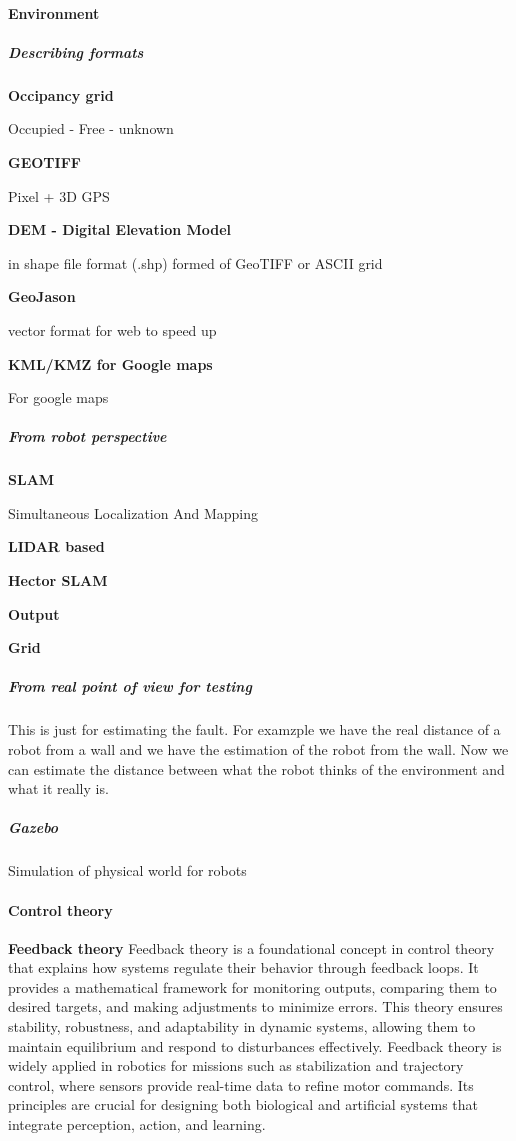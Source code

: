 \documentclass{book}
\providecommand{\ProjectDeepHeading}[2]{%
    \par\medskip\noindent\textbf{#2}\par\smallskip
}
\begin{document}

\paragraph{Environment}

\subparagraph{Describing formats}
    \ProjectDeepHeading{3}{Occipancy grid}
        Occupied - Free  - unknown
    
    
    \ProjectDeepHeading{3}{GEOTIFF}
        Pixel + 3D GPS
        
    \ProjectDeepHeading{3}{DEM - Digital Elevation Model}
        in shape file format (.shp) formed of GeoTIFF or ASCII grid
        
    \ProjectDeepHeading{3}{GeoJason}
        vector format for web to speed up
        
    \ProjectDeepHeading{3}{KML/KMZ for Google maps}
        For google maps


\subparagraph{From robot perspective}
    \ProjectDeepHeading{1}{SLAM}
        Simultaneous Localization And Mapping
        \ProjectDeepHeading{2}{LIDAR based}
            \ProjectDeepHeading{2}{Hector SLAM}
        \ProjectDeepHeading{2}{Output}
            \ProjectDeepHeading{3}{Grid}

\subparagraph{From real point of view for testing}
    This is just for estimating the fault. For examzple we have the real distance of a robot from a wall and we have the estimation of the robot from the wall. Now we can estimate the distance between what the robot thinks of the environment and what it really is.


\subparagraph{Gazebo}
Simulation of physical world for robots


\paragraph{Control theory}
\textbf{Feedback theory}
Feedback theory is a foundational concept in control theory that explains how systems regulate their behavior through feedback loops. It provides a mathematical framework for monitoring outputs, comparing them to desired targets, and making adjustments to minimize errors. This theory ensures stability, robustness, and adaptability in dynamic systems, allowing them to maintain equilibrium and respond to disturbances effectively. Feedback theory is widely applied in robotics for missions such as stabilization and trajectory control, where sensors provide real-time data to refine motor commands. Its principles are crucial for designing both biological and artificial systems that integrate perception, action, and learning.
\end{document}
